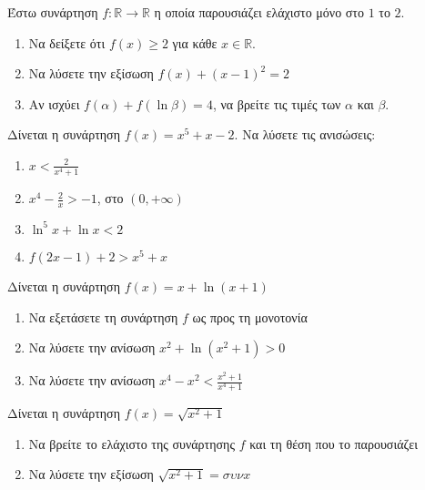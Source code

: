 \documentclass{presentation}
\begin{document}
\begin{askisi}
  Έστω συνάρτηση $f:\mathbb{R}\to \mathbb{R}$ η οποία παρουσιάζει ελάχιστο μόνο στο $1$ το $2$.
  \begin{enumerate}
    \item Να δείξετε ότι $f(x)\ge 2$ για κάθε $x\in\mathbb{R}$. \pause
    \item Να λύσετε την εξίσωση $f(x)+(x-1)^2=2$ \pause
    \item Αν ισχύει $f(α)+f(\ln β)=4$, να βρείτε τις τιμές των $α$ και $β$.
  \end{enumerate}

\end{askisi}

\begin{askisi}
  Δίνεται η συνάρτηση $f(x)=x^5+x-2$. Να λύσετε τις ανισώσεις:
  \begin{enumerate}
    \item $x<\frac{2}{x^4+1}$ \pause
    \item $x^4-\frac{2}{x}>-1$, στο $(0,+\infty)$ \pause
    \item $\ln^5 x+\ln x<2$ \pause
    \item $f(2x-1)+2>x^5+x$
  \end{enumerate}

\end{askisi}

\begin{askisi}
  Δίνεται η συνάρτηση $f(x)=x+\ln (x+1)$
  \begin{enumerate}
    \item Να εξετάσετε τη συνάρτηση $f$ ως προς τη μονοτονία \pause
    \item Να λύσετε την ανίσωση $x^2+\ln (x^2+1)>0$ \pause
    \item Να λύσετε την ανίσωση $x^4-x^2<\frac{x^2+1}{x^4+1}$
  \end{enumerate}

\end{askisi}

\begin{askisi}
  Δίνεται η συνάρτηση $f(x)=\sqrt{x^2+1}$
  \begin{enumerate}
    \item Να βρείτε το ελάχιστο της συνάρτησης $f$ και τη θέση που το παρουσιάζει \pause
    \item Να λύσετε την εξίσωση $\sqrt{x^2+1}=συνx$
  \end{enumerate}

\end{askisi}
\end{document}
